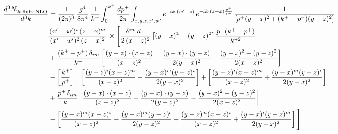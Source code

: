 \documentclass[9pt]{article}
\numberwithin{equation}{section}
\begin{document}
\begin{align}
    \frac{d^{3}N_{2b\,\rm finite\, NLO}^{\rm}}{d^{3}k} & = \frac{1}{(2\pi)^{3}}\,\frac{g^{4}}{8\pi^{4}}\,\frac{1}{k^{+}}\int_{0}^{k^{+}}\frac{dp^{+}}{2\pi}\int_{x,y,z,x',w'}e^{-ik\cdot(w'-z)}\,e^{-ik\cdot(z-x)\frac{p^{+}}{k^{+}}}\,\frac{1}{\left[p^{+}(y-x)^{2}+(k^{+}-p^{+})(y-z)^{2}\right]}\notag \\ & \frac{(x'-w')^{i}\,(z-x)^{m}}{(x'-w')^{2}\,(z-x)^{2}}\,\times\Bigg[\frac{\delta^{im}\,d_{\perp}}{2\,(x-z)^{2}}\left[(y-x)^{2}-(y-z)^{2}\right]\frac{p^{+}(k^{+}-p^{+})}{k^{+2}}
\notag \\ & +\frac{(k^{+}-p^{+})\,\delta_{im}}{k^{+}}\left[\frac{(y-z)\cdot(x-z)}{(x-z)^{2}}+\frac{(y-x)\cdot(y-z)}{2(y-x)^{2}}-\frac{(y-x)^{2}-(y-z)^{2}}{2(x-z)^{2}}\right]\notag\\
&-\left[\frac{k^{+}}{p^{+}}\right]_{+}\,\left[\frac{(y-z)^{i}(x-z)^{m}}{(x-z)^{2}}+\frac{(y-x)^{m}(y-z)^{i}}{2(y-x)^{2}}\right]+\left[\frac{(y-z)^{i}(x-z)^{m}}{(x-z)^{2}}+\frac{(y-x)^{m}(y-z)^{i}}{2(y-x)^{2}}\right]\notag\\
&+\frac{p^{+}\,\delta_{im}}{k^{+}}\left[\frac{(y-x)\cdot(x-z)}{(x-z)^{2}}-\frac{(y-x)\cdot(y-z)}{2(y-z)^{2}}-\frac{(y-x)^{2}-(y-z)^{2}}{2(x-z)^{2}}\right]\notag\\
&-\left[\frac{(y-x)^{m}(x-z)^{i}}{(x-z)^{2}}-\frac{(y-x)^{m}(y-z)^{i}}{2(y-z)^{2}}+\frac{(y-z)^{m}(x-z)^{i}}{(x-z)^{2}}+\frac{(y-x)^{i}(y-z)^{m}}{2(y-x)^{2}}\right]\Bigg]\notag\\

\end{align}
\end{document}
